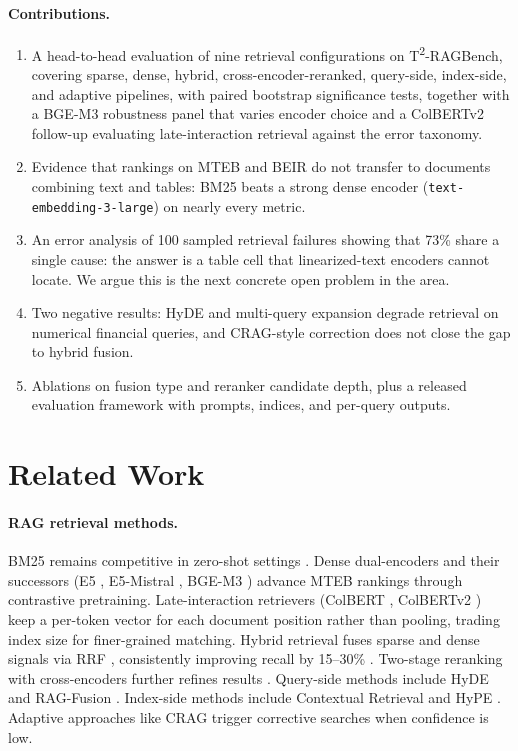 \documentclass{article}
\begin{document}
\paragraph{Contributions.}
\begin{enumerate}
    \item A head-to-head evaluation of nine retrieval configurations on T\textsuperscript{2}-RAGBench, covering sparse, dense, hybrid, cross-encoder-reranked, query-side, index-side, and adaptive pipelines, with paired bootstrap significance tests, together with a BGE-M3 robustness panel that varies encoder choice and a ColBERTv2 follow-up evaluating late-interaction retrieval against the error taxonomy.
    \item Evidence that rankings on MTEB and BEIR do not transfer to documents combining text and tables: BM25 beats a strong dense encoder (\texttt{text-embedding-3-large}) on nearly every metric.
    \item An error analysis of 100 sampled retrieval failures showing that 73\% share a single cause: the answer is a table cell that linearized-text encoders cannot locate. We argue this is the next concrete open problem in the area.
    \item Two negative results: HyDE and multi-query expansion degrade retrieval on numerical financial queries, and CRAG-style correction does not close the gap to hybrid fusion.
    \item Ablations on fusion type and reranker candidate depth, plus a released evaluation framework with prompts, indices, and per-query outputs.
\end{enumerate}

\section{Related Work}
\label{sec:related}

\paragraph{RAG retrieval methods.}
BM25 remains competitive in zero-shot settings \citep{thakur2021beir}. Dense dual-encoders \citep{karpukhin2020dpr} and their successors (E5 \citep{wang2022e5}, E5-Mistral \citep{wang2024e5mistral}, BGE-M3 \citep{chen2024bgem3}) advance MTEB rankings through contrastive pretraining. Late-interaction retrievers (ColBERT \citep{khattab2020colbert}, ColBERTv2 \citep{santhanam2022colbertv2}) keep a per-token vector for each document position rather than pooling, trading index size for finer-grained matching. Hybrid retrieval fuses sparse and dense signals via RRF \citep{cormack2009rrf}, consistently improving recall by 15--30\% \citep{li2025ragbestpractices}. Two-stage reranking with cross-encoders further refines results \citep{gao2024ragsurvey}. Query-side methods include HyDE \citep{gao2022hyde} and RAG-Fusion \citep{raudaschl2023ragfusion}. Index-side methods include Contextual Retrieval \citep{anthropic2024contextual} and HyPE \citep{vake2025hype}. Adaptive approaches like CRAG \citep{yan2024crag} trigger corrective searches when confidence is low.
\end{document}
